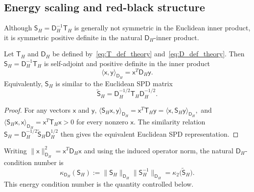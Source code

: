 \documentclass[final,onefignum,onetabnum]{siamart250211}
\newcommand{\vct}[1]{\bm{\mathsf{#1}}}
\newcommand{\mtx}[1]{\bm{\mathsf{#1}}}
\theoremstyle{definition}
\begin{document}
\subsection{Energy scaling and red-black structure}
Although $\mtx{S}_H=\mtx{D}_H^{-1}\mtx{T}_H$ is generally not symmetric in the Euclidean inner product, it is symmetric positive definite in the natural $\mtx{D}_H$-inner product.

\begin{proposition}
\label{prop:energy_symmetry}
Let $\mtx{T}_H$ and $\mtx{D}_H$ be defined by~\eqref{eq:T_def_theory} and~\eqref{eq:D_def_theory}.  Then $\mtx{S}_H=\mtx{D}_H^{-1}\mtx{T}_H$ is self-adjoint and positive definite in the inner product
\[
  \langle \vct{x},\vct{y}\rangle_{\mtx{D}_H}
  =\vct{x}^T\mtx{D}_H\vct{y}.
\]
Equivalently, $\mtx{S}_H$ is similar to the Euclidean SPD matrix
\begin{equation}
  \widetilde{\mtx{S}}_H
  =\mtx{D}_H^{-1/2}\mtx{T}_H\mtx{D}_H^{-1/2}.
  \label{eq:S_tilde}
\end{equation}
\end{proposition}

\begin{proof}
For any vectors $\vct{x}$ and $\vct{y}$,
$
  \langle \mtx{S}_H\vct{x},\vct{y}\rangle_{\mtx{D}_H}
  =\vct{x}^T\mtx{T}_H\vct{y}
  =\langle \vct{x},\mtx{S}_H\vct{y}\rangle_{\mtx{D}_H},
$
and
$
  \langle \mtx{S}_H\vct{x},\vct{x}\rangle_{\mtx{D}_H}
  =\vct{x}^T\mtx{T}_H\vct{x}>0
$
for every nonzero $\vct{x}$.  The similarity relation
$
  \mtx{S}_H
  =\mtx{D}_H^{-1/2}\widetilde{\mtx{S}}_H\mtx{D}_H^{1/2}
$
then gives the equivalent Euclidean SPD representation.
\end{proof}

Writing $\|\vct{x}\|_{\mtx{D}_H}^2=\vct{x}^T\mtx{D}_H\vct{x}$ and using the induced operator norm, the natural $\mtx{D}_H$-condition number is
\begin{equation}
  \kappa_{\mtx{D}_H}(\mtx{S}_H)
  :=\|\mtx{S}_H\|_{\mtx{D}_H}
    \|\mtx{S}_H^{-1}\|_{\mtx{D}_H}
  =\kappa_2\bigl(\widetilde{\mtx{S}}_H\bigr).
  \label{eq:energy_condition_number}
\end{equation}
This energy condition number is the quantity controlled below.  
\end{document}
